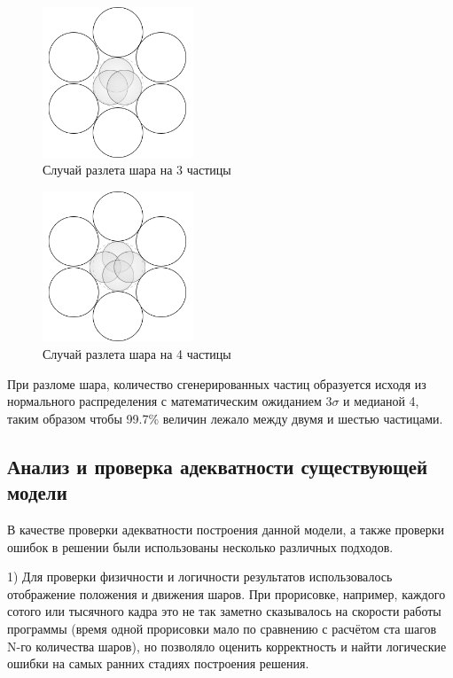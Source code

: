 \documentclass[utf8x, 14pt, oneside, a4paper]{article}
\begin{document}
\begin{figure}[H]
	\centering
	\includegraphics[width=0.4\textwidth]{3_balls} 
	\caption{Случай разлета шара на 3 частицы}
	\label{pic:3_balls}
\end{figure} 

\begin{figure}[H]
	\centering
	\includegraphics[width=0.4\textwidth]{4_balls} 
	\caption{Случай разлета шара на 4 частицы}
	\label{pic:4_balls}
\end{figure} 


При разломе шара, количество сгенерированных частиц образуется исходя из нормального распределения с математическим ожиданием $3\sigma$ и медианой 4, таким образом чтобы 99.7\% величин лежало между двумя и шестью частицами.





\subsection{Анализ и проверка адекватности существующей модели}

В качестве проверки адекватности построения данной модели, а также проверки ошибок в решении были использованы несколько различных подходов.

1) Для проверки физичности и логичности результатов использовалось отображение положения и движения шаров.
При прорисовке, например, каждого сотого или тысячного кадра это не так заметно сказывалось на скорости работы программы (время одной прорисовки мало по сравнению с расчётом ста шагов N-го количества шаров), но позволяло оценить корректность и найти логические ошибки на самых ранних стадиях построения решения.
\end{document}
